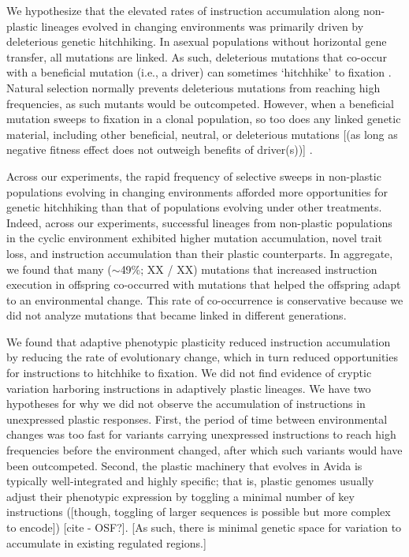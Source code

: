 We hypothesize that the elevated rates of  instruction accumulation along non-plastic lineages evolved in changing environments was primarily driven by deleterious genetic hitchhiking.
In asexual populations without horizontal gene transfer, all mutations are linked.
As such, deleterious mutations that co-occur with a beneficial mutation (i.e., a driver) can sometimes `hitchhike' to fixation \citep{smith_hitch-hiking_1974,van_den_bergh_experimental_2018,buskirk_hitchhiking_2017}.
Natural selection normally prevents deleterious mutations from reaching high frequencies, as such mutants would be outcompeted.
However, when a beneficial mutation sweeps to fixation in a clonal population, so too does any linked genetic material, including other beneficial, neutral, or deleterious mutations [(as long as negative fitness effect does not outweigh benefits of driver(s))] \cite{barton_genetic_2000, smith_hitch-hiking_1974}.

Across our experiments, the rapid frequency of selective sweeps in non-plastic populations evolving in changing environments afforded more opportunities for genetic hitchhiking than that of populations evolving under other treatments. 
Indeed, across our experiments, successful lineages from non-plastic populations in the cyclic environment exhibited higher mutation accumulation, novel trait loss, and  instruction accumulation than their plastic counterparts.
In aggregate, we found that many ($\sim$49\%; XX / XX) mutations that increased  instruction execution in offspring co-occurred with mutations that helped the offspring adapt to an environmental change.
This rate of co-occurrence is conservative because we did not analyze mutations that became linked in different generations.

We found that adaptive phenotypic plasticity reduced  instruction accumulation by reducing the rate of evolutionary change, which in turn reduced opportunities for  instructions to hitchhike to fixation.
We did not find evidence of cryptic variation harboring  instructions in adaptively plastic lineages.
We have two hypotheses for why we did not observe the accumulation of  instructions in unexpressed plastic responses.
First, the period of time between environmental changes was too fast for variants carrying unexpressed  instructions to reach high frequencies before the environment changed, after which such variants would have been outcompeted.
Second, the plastic machinery that evolves in Avida is typically well-integrated and highly specific; that is, plastic genomes usually adjust their phenotypic expression by toggling a minimal number of key instructions ([though, toggling of larger sequences is possible but more complex to encode]) [cite - OSF?].
[As such, there is minimal genetic space for variation to accumulate in existing regulated regions.]


